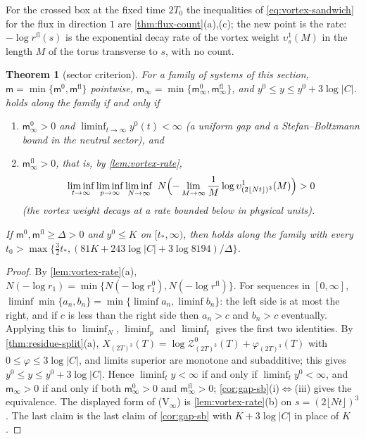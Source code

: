 \documentclass[11pt,a4paper]{amsart}
\newtheorem{theorem}{Theorem}[section]
\theoremstyle{definition}
\theoremstyle{remark}
\numberwithin{equation}{section}
\newcommand{\abs}[1]{\lvert #1\rvert}      %
\newcommand{\TT}{\mathbb{T}}               %
\newcommand{\Zc}{\mathcal{Z}}              %
\newcommand{\XT}[2]{X_{#1}(#2)}            %
\newcommand{\cube}[1]{(2#1)^3}             %
\newcommand{\Mcirc}{\text{\upshape(M$^{\circ}$)}}   %
\newcommand{\tzero}{t_0}                   %
\begin{document}
For the crossed box at the fixed time $2T_0$ the inequalities of \eqref{eq:vortex-sandwich} for the flux in direction $1$ are \cref{thm:flux-count}\textup{(a),(c)}; the new point is the rate: $-\log r^{\mathrm{fl}}(s)$ is the exponential decay rate of the vortex weight $\upsilon^1_s(M)$ in the length $M$ of the torus transverse to $s$, with no count.

\begin{theorem}[sector criterion]\label{thm:sector-criterion}
For a family of systems of this section, $\mathsf m=\min\{\mathsf m^0,\mathsf m^{\mathrm{fl}}\}$ pointwise, $\mathsf m_\infty=\min\{\mathsf m^0_\infty,\mathsf m^{\mathrm{fl}}_\infty\}$, and $y^0\le y\le y^0+3\log\abs{C}$. \Mcirc{} holds along the family if and only if
\begin{enumerate}[leftmargin=*]
\item[\textup{(N$_\infty$)}] $\mathsf m^0_\infty>0$ and $\liminf_{t\to\infty}y^0(t)<\infty$ \textup{(}a uniform gap and a Stefan--Boltzmann bound in the neutral sector\textup{)}, and
\item[\textup{(V$_\infty$)}] $\mathsf m^{\mathrm{fl}}_\infty>0$, that is, by \cref{lem:vortex-rate},
\[
\liminf_{t\to\infty}\liminf_{p\to\infty}\liminf_{N\to\infty}\ N\Bigl(-\lim_{M\to\infty}\frac1M\log\upsilon^1_{\cube{\lfloor Nt\rfloor}}(M)\Bigr)>0
\]
\textup{(}the vortex weight decays at a rate bounded below in physical units\textup{)}.
\end{enumerate}
If $\mathsf m^0,\mathsf m^{\mathrm{fl}}\ge\Delta>0$ and $y^0\le K$ on $[t_*,\infty)$, then \Mcirc{} holds along the family with every $\tzero>\max\{\frac32t_*,(81K+243\log\abs{C}+3\log8194)/\Delta\}$.
\end{theorem}

\begin{proof}
By \cref{lem:vortex-rate}\textup{(a)}, $N(-\log r_1)=\min\{N(-\log r_1^0),N(-\log r^{\mathrm{fl}})\}$. For sequences in $[0,\infty]$, $\liminf\min\{a_n,b_n\}=\min\{\liminf a_n,\liminf b_n\}$: the left side is at most the right, and if $c$ is less than the right side then $a_n>c$ and $b_n>c$ eventually. Applying this to $\liminf_N$, $\liminf_p$ and $\liminf_t$ gives the first two identities. By \cref{thm:residue-split}\textup{(a)}, $\XT{\cube T}{T}=\log\Zc^0_{\cube T}(T)+\varphi_{\cube T}(T)$ with $0\le\varphi\le3\log\abs{C}$, and limits superior are monotone and subadditive; this gives $y^0\le y\le y^0+3\log\abs{C}$. Hence $\liminf_ty<\infty$ if and only if $\liminf_ty^0<\infty$, and $\mathsf m_\infty>0$ if and only if both $\mathsf m^0_\infty>0$ and $\mathsf m^{\mathrm{fl}}_\infty>0$; \cref{cor:gap-sb}\textup{(i)}$\Leftrightarrow$\textup{(iii)} gives the equivalence. The displayed form of \textup{(V$_\infty$)} is \cref{lem:vortex-rate}\textup{(b)} on $s=\cube{\lfloor Nt\rfloor}$. The last claim is the last claim of \cref{cor:gap-sb} with $K+3\log\abs{C}$ in place of $K$.
\end{proof}
\end{document}
